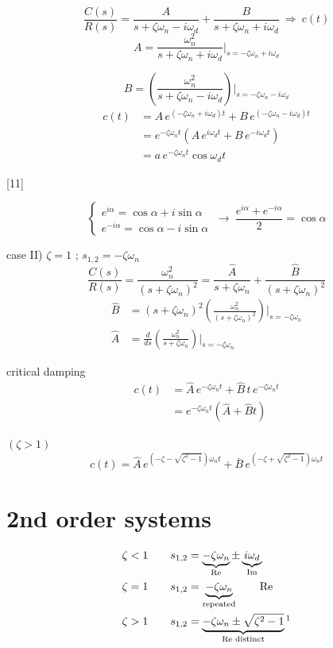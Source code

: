 \documentclass[11pt,a4paper]{article}
\begin{document}

\[
\frac{C(s)}{R(s)}=\frac{A}{s+\zeta\omega_n-i\omega_d}+\frac{B}{s+\zeta\omega_n+i\omega_d}\ \Rightarrow\ c(t)
\]
\[
A=\frac{\omega_n^2}{s+\zeta\omega_n+i\omega_d}\Bigg|_{s=-\zeta\omega_n+i\omega_d}
\]

\[
B=\left(\frac{\omega_n^2}{s+\zeta\omega_n-i\omega_d}\right)\Bigg|_{s=-\zeta\omega_n-i\omega_d}
\]
\begin{align*}
c(t)&=A\,e^{(-\zeta\omega_n+i\omega_d)t}+B\,e^{(-\zeta\omega_n-i\omega_d)t}\\
&=e^{-\zeta\omega_n t}\left(A\,e^{i\omega_d t}+B\,e^{-i\omega_d t}\right)\\
&=a\,e^{-\zeta\omega_n t}\cos\omega_d t
\end{align*}

[11]

\[
\left\{\begin{array}{l}e^{i\alpha}=\cos\alpha+i\sin\alpha\\ e^{-i\alpha}=\cos\alpha-i\sin\alpha\end{array}\right.
\ \longrightarrow\ \frac{e^{i\alpha}+e^{-i\alpha}}{2}=\cos\alpha
\]

case II) $\zeta=1$ \quad ; \quad $s_{1,2}=-\zeta\omega_n$
\[
\frac{C(s)}{R(s)}=\frac{\omega_n^2}{(s+\zeta\omega_n)^2}=\frac{\hat{A}}{s+\zeta\omega_n}+\frac{\hat{B}}{(s+\zeta\omega_n)^2}
\]
\begin{align*}
\hat{B}&=(s+\zeta\omega_n)^2\left(\frac{\omega_n^2}{(s+\zeta\omega_n)^2}\right)\Bigg|_{s=-\zeta\omega_n}\\
\hat{A}&=\frac{d}{ds}\left(\frac{\omega_n^2}{s+\zeta\omega_n}\right)\Bigg|_{s=-\zeta\omega_n}
\end{align*}

critical damping
\begin{align*}
c(t)&=\hat{A}\,e^{-\zeta\omega_n t}+\hat{B}\,t\,e^{-\zeta\omega_n t}\\
&=e^{-\zeta\omega_n t}\left(\hat{A}+\hat{B}t\right)
\end{align*}

 $(\zeta>1)$
\[
c(t)=\hat{A}\,e^{\left(-\zeta-\sqrt{\zeta^2-1}\right)\omega_n t}+\bar{B}\,e^{\left(-\zeta+\sqrt{\zeta^2-1}\right)\omega_n t}
\]

\section{2nd order systems}
\begin{align*}
\zeta<1\qquad & s_{1,2}=\underbrace{-\zeta\omega_n}_{\text{Re}}\pm\underbrace{i\omega_d}_{\text{Im}}\\
\zeta=1\qquad & s_{1,2}=\underbrace{-\zeta\omega_n}_{\text{repeated}}\qquad\text{Re}\\
\zeta>1\qquad & s_{1,2}=\underbrace{-\zeta\omega_n\pm\sqrt{\zeta^2-1}}_{\text{Re distinct}}\footnotemark
\end{align*}
\end{document}
